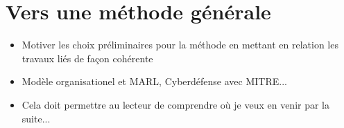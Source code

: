 \section{Vers une méthode générale}
\begin{itemize}

    \item Motiver les choix préliminaires pour la méthode en mettant en relation les travaux liés de façon cohérente
    \item Modèle organisationel et MARL, Cyberdéfense avec MITRE...
    \item Cela doit permettre au lecteur de comprendre où je veux en venir par la suite...
\end{itemize}
